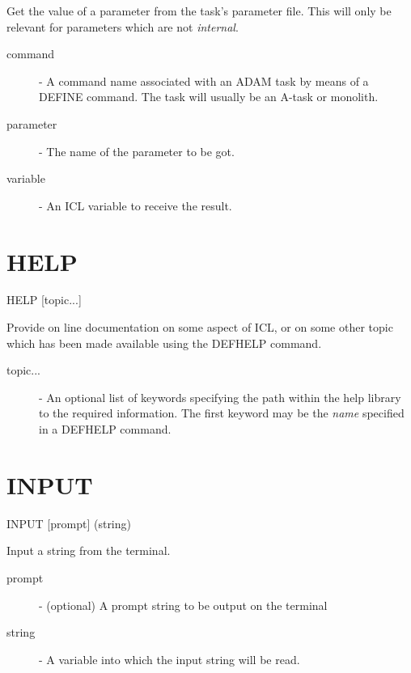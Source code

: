 Get the value of a parameter from the task's parameter file.
This will only be relevant for parameters which are not {\em internal}.

\begin{description}

\item[command] - A command name associated with an ADAM task by means
                 of a DEFINE command. The task will usually
                 be an A-task or monolith.

\item[parameter] - The name of the parameter to be got.

\item[variable] - An ICL variable to receive the result.

\end{description}
                                                            
\section{HELP}

   HELP \hspace{.5cm} [topic...]

 Provide on line documentation on some aspect of ICL, or on some other
 topic which has been made available using the DEFHELP command.

\begin{description}

\item[topic...]  - An optional list of keywords specifying the path within the
help library to the required information. 
The first keyword may be the {\em name} specified in a DEFHELP command. 

\end{description}

\section{INPUT}

   INPUT \hspace{.5cm} [prompt] \hspace{.5cm}  (string)

 Input a string from the terminal.
\begin{description}

\item[prompt]  -  (optional) A prompt string to be output on the terminal

\item[string]  -  A variable into which the input string will be read.

\end{description}


